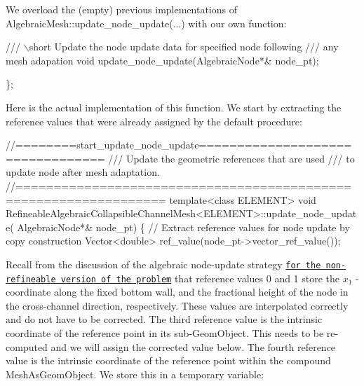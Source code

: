 We overload the (empty) previous implementations of {\ttfamily Algebraic\+Mesh\+::update\+\_\+node\+\_\+update}(...) with our own function\+:


\begin{DoxyCodeInclude}
 \textcolor{comment}{/// \(\backslash\)short Update the node update data for specified node following }
\textcolor{comment}{ /// any mesh adapation}
\textcolor{comment}{} \textcolor{keywordtype}{void} update\_node\_update(AlgebraicNode*& node\_pt);

\}; 

\end{DoxyCodeInclude}


Here is the actual implementation of this function. We start by extracting the reference values that were already assigned by the default procedure\+:

 
\begin{DoxyCodeInclude}
\textcolor{comment}{//========start\_update\_node\_update=================================}
\textcolor{comment}{/// Update the geometric references that are used }
\textcolor{comment}{}\textcolor{comment}{/// to update node after mesh adaptation.}
\textcolor{comment}{}\textcolor{comment}{//=================================================================}
\textcolor{keyword}{template}<\textcolor{keyword}{class} ELEMENT>
\textcolor{keywordtype}{void} RefineableAlgebraicCollapsibleChannelMesh<ELEMENT>::update\_node\_update(
 AlgebraicNode*& node\_pt)
\{
 \textcolor{comment}{// Extract reference values for node update by copy construction}
 Vector<double> ref\_value(node\_pt->vector\_ref\_value());

\end{DoxyCodeInclude}


Recall from the discussion of the algebraic node-\/update strategy \href{../../fsi_collapsible_channel_algebraic/html/index.html#mesh}{\tt for the non-\/refineable version of the problem} that reference values 0 and 1 store the $ x_1 $ -\/ coordinate along the fixed bottom wall, and the fractional height of the node in the cross-\/channel direction, respectively. These values are interpolated correctly and do not have to be corrected. The third reference value is the intrinsic coordinate of the reference point in its sub-\/{\ttfamily Geom\+Object}. This needs to be re-\/computed and we will assign the corrected value below. The fourth reference value is the intrinsic coordinate of the reference point within the compound {\ttfamily Mesh\+As\+Geom\+Object}. We store this in a temporary variable\+:


